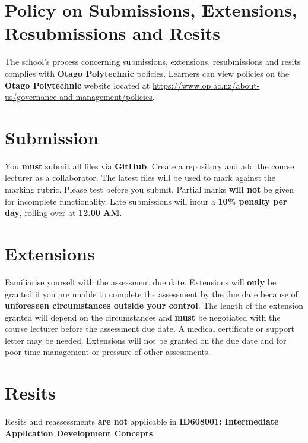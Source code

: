 \documentclass{article}
\begin{document}
	\section*{Policy on Submissions, Extensions, Resubmissions and Resits}
	The school's process concerning submissions, extensions, resubmissions and
	resits complies with \textbf{Otago Polytechnic} policies. Learners can view
	policies on the \textbf{Otago Polytechnic} website located at \href{https://www.op.ac.nz/about-us/governance-and-management/policies}{https://www.op.ac.nz/about-us/governance-and-management/policies}.

	\section*{Submission}
	You \textbf{must} submit all files via \textbf{GitHub}. Create a
	repository and add the course lecturer as a collaborator. The latest files will be used to mark against the marking rubric. Please test before you submit. Partial marks \textbf{will not} be given for incomplete functionality. Late submissions will incur a \textbf{10\% penalty per day}, rolling over at \textbf{12.00 AM}.

	\section*{Extensions}
	Familiarise yourself with the assessment due date. Extensions will \textbf{only}
	be granted if you are unable to complete the assessment by the due date
	because of \textbf{unforeseen circumstances outside your control}. The length
	of the extension granted will depend on the circumstances and \textbf{must} be
	negotiated with the course lecturer before the assessment due date. A medical
	certificate or support letter may be needed. Extensions will not be granted on
	the due date and for poor time management or pressure of other assessments.

	\section*{Resits}
	Resits and reassessments \textbf{are not} applicable in \textbf{ID608001: Intermediate
	Application Development Concepts}.
\end{document}
